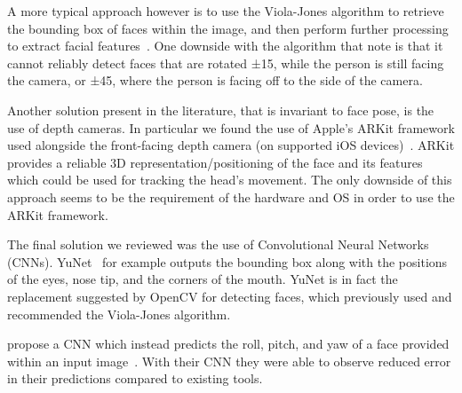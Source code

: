 A more typical approach however is to use the Viola-Jones algorithm to retrieve the bounding box of faces within the image, and then perform further processing to extract facial features~\cite{neto2012real, francone2011using, kim2017real}.
One downside with the algorithm that \citeauthor{viola2004robust} note is that it cannot reliably detect faces that are rotated ±15\textdegree, while the person is still facing the camera, or ±45\textdegree, where the person is facing off to the side of the camera.

Another solution present in the literature, that is invariant to face pose, is the use of depth cameras. 
In particular we found the use of Apple's ARKit framework used alongside the front-facing depth camera (on supported iOS devices)~\cite{voelker2020headreach,hueber2020headbang,deepateep2020facial}.
ARKit provides a reliable 3D representation/positioning of the face and its features  which could be used for tracking the head's movement.
The only downside of this approach seems to be the requirement of the hardware and OS in order to use the ARKit framework.

The final solution we reviewed was the use of Convolutional Neural Networks (CNNs).
YuNet~\cite{yu2022yunet} for example outputs the bounding box along with the positions of the eyes, nose tip, and the corners of the mouth. YuNet is in fact the replacement suggested by OpenCV for detecting faces, which previously used and recommended the Viola-Jones algorithm.

\citeauthor{yan2021fast} propose a CNN which instead predicts the roll, pitch, and yaw of a face provided within an input image~\cite{yan2021fast}. With their CNN they were able to observe reduced error in their predictions compared to existing tools.

